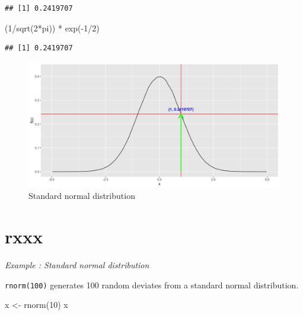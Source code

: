 \documentclass[
]{book}
\newenvironment{Shaded}{\begin{snugshade}}{\end{snugshade}}
\newcommand{\DecValTok}[1]{\textcolor[rgb]{0.00,0.00,0.81}{#1}}
\newcommand{\FunctionTok}[1]{\textcolor[rgb]{0.00,0.00,0.00}{#1}}
\newcommand{\NormalTok}[1]{#1}
\newcommand{\OtherTok}[1]{\textcolor[rgb]{0.56,0.35,0.01}{#1}}
\newcommand{\SpecialCharTok}[1]{\textcolor[rgb]{0.00,0.00,0.00}{#1}}
\begin{document}
\begin{verbatim}
## [1] 0.2419707
\end{verbatim}

\begin{Shaded}
\begin{Highlighting}[]
\NormalTok{(}\DecValTok{1}\SpecialCharTok{/}\FunctionTok{sqrt}\NormalTok{(}\DecValTok{2}\SpecialCharTok{*}\NormalTok{pi)) }\SpecialCharTok{*} \FunctionTok{exp}\NormalTok{(}\SpecialCharTok{{-}}\DecValTok{1}\SpecialCharTok{/}\DecValTok{2}\NormalTok{)}
\end{Highlighting}
\end{Shaded}

\begin{verbatim}
## [1] 0.2419707
\end{verbatim}

\begin{figure}

{\centering \includegraphics{figure/norm5-1} 

}

\caption{Standard normal distribution}\label{fig:norm5}
\end{figure}

\hypertarget{rxxx}{%
\section{rxxx}\label{rxxx}}

\emph{Example : Standard normal distribution}

\texttt{rnorm(100)} generates 100 random deviates from a standard normal distribution.

\begin{Shaded}
\begin{Highlighting}[]
\NormalTok{x }\OtherTok{\textless{}{-}} \FunctionTok{rnorm}\NormalTok{(}\DecValTok{10}\NormalTok{)}
\NormalTok{x}
\end{Highlighting}
\end{Shaded}
\end{document}
